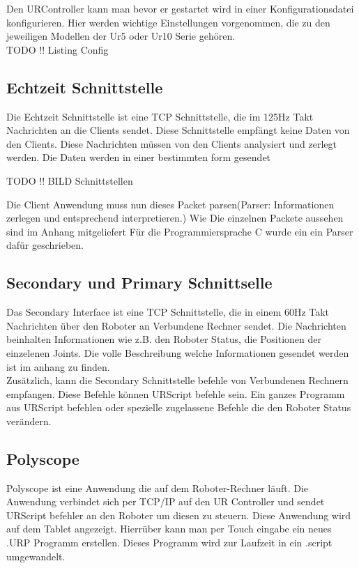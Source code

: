 Den URController kann man bevor er gestartet wird in einer Konfigurationsdatei konfigurieren.
Hier werden wichtige Einstellungen vorgenommen, die zu den jeweiligen Modellen der Ur5 oder Ur10 Serie gehören.
\\
TODO !! Listing Config

\subsection{Echtzeit Schnittstelle}
\label{urcontrol_rci_gru}

Die Echtzeit Schnittstelle ist eine TCP Schnittstelle, die im 125Hz Takt Nachrichten an die Clients sendet. Diese Schnittstelle empfängt keine Daten von den Clients. Diese Nachrichten müssen von den Clients analysiert und zerlegt werden. Die Daten werden in einer bestimmten form gesendet

TODO !! BILD Schnittstellen

Die Client Anwendung muss nun dieses Packet parsen(Parser: Informationen zerlegen und entsprechend interpretieren.)
Wie Die einzelnen Packete aussehen sind im Anhang mitgeliefert
Für die Programmiersprache C wurde ein ein Parser dafür geschrieben.

\subsection{Secondary und Primary Schnittselle}
\label{urcontrol_spi_gru}

Das Secondary Interface ist eine TCP Schnittstelle, die in einem 60Hz Takt Nachrichten über den Roboter an Verbundene Rechner sendet.
Die Nachrichten beinhalten Informationen wie z.B. den Roboter Status, die Positionen der einzelenen Joints.
Die volle Beschreibung welche Informationen gesendet werden ist im anhang zu finden.
\\
Zusätzlich, kann die Secondary Schnittstelle befehle von Verbundenen Rechnern empfangen. 
Diese Befehle können URScript befehle sein. Ein ganzes Programm aus URScript befehlen oder spezielle zugelassene Befehle die den Roboter Status verändern.

\subsection{Polyscope}
\label{urcontrol_polyscope_gru}

Polyscope ist eine Anwendung die auf dem Roboter-Rechner läuft. Die Anwendung verbindet sich per TCP/IP auf den UR Controller und sendet URScript befehler an den Roboter um diesen zu steuern.
Diese Anwendung wird auf dem Tablet angezeigt. Hierrüber kann man per Touch eingabe ein neues .URP Programm erstellen. Dieses Programm wird zur Laufzeit in ein .script umgewandelt.

